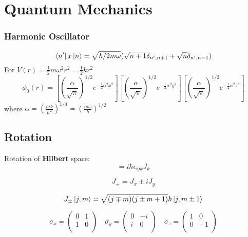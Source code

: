 \chapter{Quantum Mechanics}
\subsection{Harmonic Oscillator}
\[
    \bra{n'}x\ket{n}=\sqrt{\hbar/2m\omega}(\sqrt{n+1}\delta_{n',n+1}+\sqrt{n}\delta_{n',n-1})
    \]
For $V(r)=\frac{1}{2}m\omega^2r^2=\frac{1}{2}kr^2$
\[
    \phi_0(r)=[(\frac{\alpha}{\sqrt{\pi}})^{1/2}e^{-\frac{1}{2}\alpha^2x^2}]
    [(\frac{\alpha}{\sqrt{\pi}})^{1/2}e^{-\frac{1}{2}\alpha^2y^2}]
    [(\frac{\alpha}{\sqrt{\pi}})^{1/2}e^{-\frac{1}{2}\alpha^2z^2}]
    \]
where $\alpha=(\frac{mk}{\hbar^2})^{1/4}=(\frac{m\omega}{\hbar})^{1/2}$

\section{Rotation}
Rotation of \textbf{Hilbert} space:
\begin{equation}
    [J_i, J_j] = i\hbar\epsilon_{ijk}J_k
\end{equation}

\begin{equation}
    J_{\pm} = J_x \pm iJ_y
\end{equation}

\begin{equation}
    J_{\pm}\ket{j,m} = \sqrt{(j\mp m)(j\pm m+1)}\hbar\ket{j,m\pm 1}
\end{equation}

\begin{equation}
    \label{Pauli matrixes}
    \sigma_x = 
    \begin{pmatrix}
	0   &	1   \\
	1   &	0   \\
    \end{pmatrix}   \quad
    \sigma_y = 
    \begin{pmatrix}
	0   &	-i   \\
	i   &	0   \\
    \end{pmatrix}   \quad
    \sigma_z = 
    \begin{pmatrix}
	1   &	0   \\
	0   &	-1   \\
    \end{pmatrix}   
\end{equation}


